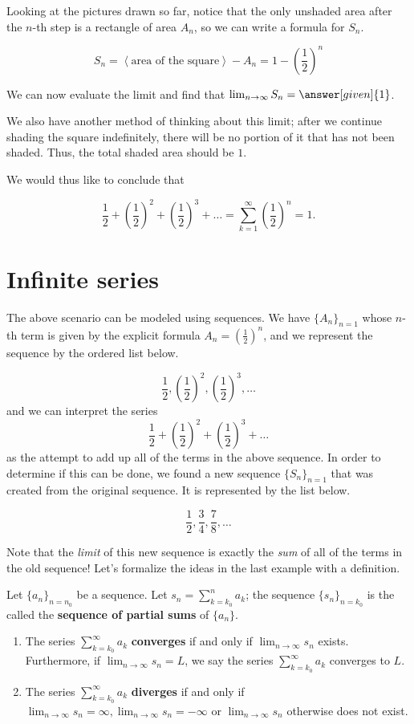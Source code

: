 \documentclass{ximera}
\begin{document}
\begin{example}
Looking at the pictures drawn so far, notice that the only unshaded area after the $n$-th step is a rectangle of area $A_n$, so we can write a formula for $S_n$.   

\[
S_n = \left<\textrm{area of the square}\right>-A_n = 1-\left(\frac{1}{2}\right)^n
\]

We can now evaluate the limit and find that $\lim_{n \to \infty} S_n =\answer[given]{1}$.

We also have another method of thinking about this limit; after we continue shading the square indefinitely, there will be no portion of it that has not been shaded.  Thus, the total shaded area should be $1$.

We would thus like to conclude that

\[
\frac{1}{2} + \left(\frac{1}{2}\right)^2+ \left(\frac{1}{2}\right)^3+ \ldots = \sum_{k=1}^{\infty} \left(\frac{1}{2}\right)^n =1.
\]
\end{example}

\section{Infinite series}
The above scenario can be modeled using sequences.  We have $\{A_n\}_{n=1}$ whose $n$-th term is given by the explicit formula $A_n=\left(\frac{1}{2}\right)^n$, and we represent the sequence by the ordered list below.

\[
\frac{1}{2},\left(\frac{1}{2}\right)^2,\left(\frac{1}{2}\right)^3,\ldots
\]
and we can interpret the series $$\frac{1}{2} + \left(\frac{1}{2}\right)^2+ \left(\frac{1}{2}\right)^3+ \ldots$$ as the attempt to add up all of the terms in the above sequence.  In order to determine if this can be done, we found a new sequence $\{S_n\}_{n=1}$ that was created from the original sequence.  It is represented by the list below.

\[
\frac{1}{2},\frac{3}{4},\frac{7}{8},\ldots
\]

Note that the \emph{limit} of this new sequence is exactly the \emph{sum} of all of the terms in the old sequence!  Let's formalize the ideas in the last example with a definition.

\begin{definition}
Let $\{a_n\}_{n=n_0}$ be a sequence.  Let $s_n = \sum_{k=k_0}^n a_k$; the sequence $\{s_n\}_{n=k_0}$ is the called the
  \textbf{sequence of partial sums} of $\{a_n\}$.  

\begin{enumerate}
\item The series $\sum_{k=k_0}^\infty a_k$ \textbf{converges} if and only if $\lim_{n\to\infty} s_n$ exists.  Furthermore, if $\lim_{n\to\infty} s_n =L$, we say the series $\sum_{k=k_0}^\infty a_k$ converges to $L$. 
\item The series $\sum_{k=k_0}^\infty a_k$ \textbf{diverges} if and only if $\lim_{n\to\infty} s_n = \infty, \lim_{n\to\infty} s_n = -\infty$ or $\lim_{n\to\infty} s_n $ otherwise does not exist.  
\end{enumerate}
\end{definition}
\end{document}
